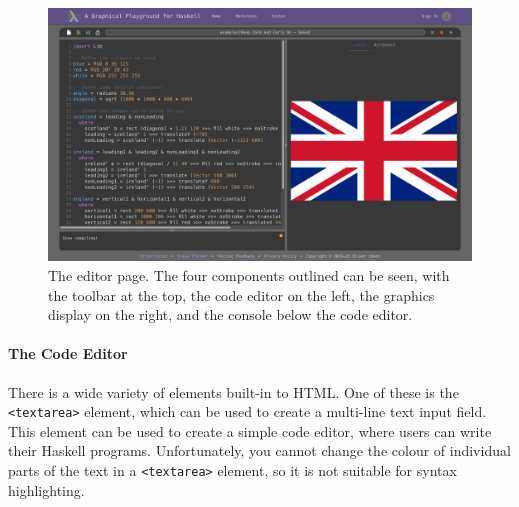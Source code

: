 \documentclass[../main.tex]{subfiles}
\begin{document}
                \begin{figure}[H]
                    \centering
                    \includegraphics[width=0.9\linewidth]{images/editor.png}
                        \caption{The editor page.
                            The four components outlined can be seen, with the toolbar at the top, the code
                                editor on the left, the graphics display on the right, and the console below
                                the code editor.
                        }
                        \label{fig:editor}
                \end{figure}

                \paragraph{The Code Editor}
                    There is a wide variety of elements built-in to HTML.
                    One of these is the \texttt{<textarea>} element, which can be used to create a
                        multi-line text input field.
                    This element can be used to create a simple code editor, where users can write
                        their Haskell programs.
                    Unfortunately, you cannot change the colour of individual parts of the text in
                        a \texttt{<textarea>} element, so it is not suitable for syntax highlighting.
\end{document}
